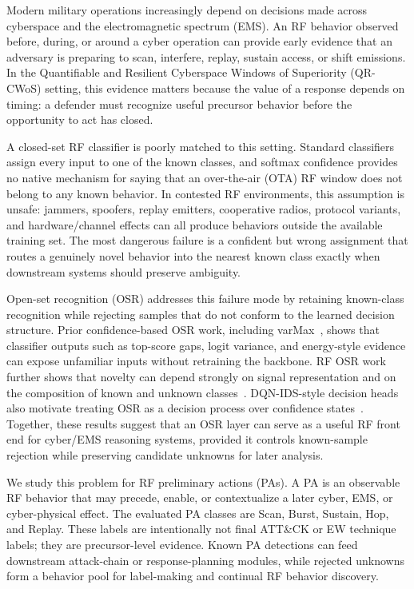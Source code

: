 Modern military operations increasingly depend on decisions made across cyberspace and the electromagnetic spectrum (EMS). An RF behavior observed before, during, or around a cyber operation can provide early evidence that an adversary is preparing to scan, interfere, replay, sustain access, or shift emissions. In the Quantifiable and Resilient Cyberspace Windows of Superiority (QR-CWoS) setting, this evidence matters because the value of a response depends on timing: a defender must recognize useful precursor behavior before the opportunity to act has closed.

A closed-set RF classifier is poorly matched to this setting. Standard classifiers assign every input to one of the known classes, and softmax confidence provides no native mechanism for saying that an over-the-air (OTA) RF window does not belong to any known behavior. In contested RF environments, this assumption is unsafe: jammers, spoofers, replay emitters, cooperative radios, protocol variants, and hardware/channel effects can all produce behaviors outside the available training set. The most dangerous failure is a confident but wrong assignment that routes a genuinely novel behavior into the nearest known class exactly when downstream systems should preserve ambiguity.

Open-set recognition (OSR) addresses this failure mode by retaining known-class recognition while rejecting samples that do not conform to the learned decision structure. Prior confidence-based OSR work, including varMax~\cite{baye2024varmax,broggi2025varmax}, shows that classifier outputs such as top-score gaps, logit variance, and energy-style evidence can expose unfamiliar inputs without retraining the backbone. RF OSR work further shows that novelty can depend strongly on signal representation and on the composition of known and unknown classes~\cite{trott2026model}. DQN-IDS-style decision heads also motivate treating OSR as a decision process over confidence states~\cite{tiwaridqn}. Together, these results suggest that an OSR layer can serve as a useful RF front end for cyber/EMS reasoning systems, provided it controls known-sample rejection while preserving candidate unknowns for later analysis.

We study this problem for RF preliminary actions (PAs). A PA is an observable RF behavior that may precede, enable, or contextualize a later cyber, EMS, or cyber-physical effect. The evaluated PA classes are Scan, Burst, Sustain, Hop, and Replay. These labels are intentionally not final ATT\&CK or EW technique labels; they are precursor-level evidence. Known PA detections can feed downstream attack-chain or response-planning modules, while rejected unknowns form a behavior pool for label-making and continual RF behavior discovery.

